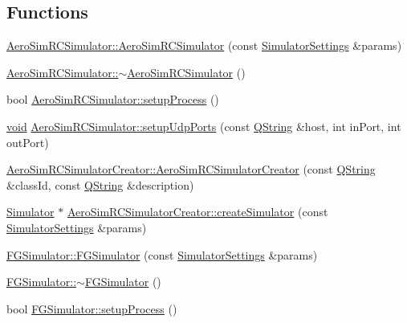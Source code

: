 \subsection*{\-Functions}
\begin{DoxyCompactItemize}
\item 
\hyperlink{group___h_i_t_l_plugin_ga0f5306deb22a08981f652dbb154f3e55}{\-Aero\-Sim\-R\-C\-Simulator\-::\-Aero\-Sim\-R\-C\-Simulator} (const \hyperlink{group___h_i_t_l_plugin_ga052199f1328d3002bce3e45345aa7f4e}{\-Simulator\-Settings} \&params)
\item 
\hyperlink{group___h_i_t_l_plugin_ga8627049b9a905adb162384c682255bd3}{\-Aero\-Sim\-R\-C\-Simulator\-::$\sim$\-Aero\-Sim\-R\-C\-Simulator} ()
\item 
bool \hyperlink{group___h_i_t_l_plugin_gae47d5533f13e5ad9a6095ba2bc61bade}{\-Aero\-Sim\-R\-C\-Simulator\-::setup\-Process} ()
\item 
\hyperlink{group___u_a_v_objects_plugin_ga444cf2ff3f0ecbe028adce838d373f5c}{void} \hyperlink{group___h_i_t_l_plugin_ga593e2c3f1a4b5e541f32668be73ece6d}{\-Aero\-Sim\-R\-C\-Simulator\-::setup\-Udp\-Ports} (const \hyperlink{group___u_a_v_objects_plugin_gab9d252f49c333c94a72f97ce3105a32d}{\-Q\-String} \&host, int in\-Port, int out\-Port)
\item 
\hyperlink{group___h_i_t_l_plugin_ga7e85a0e376c9dcd7dae84a4f2cf14d10}{\-Aero\-Sim\-R\-C\-Simulator\-Creator\-::\-Aero\-Sim\-R\-C\-Simulator\-Creator} (const \hyperlink{group___u_a_v_objects_plugin_gab9d252f49c333c94a72f97ce3105a32d}{\-Q\-String} \&class\-Id, const \hyperlink{group___u_a_v_objects_plugin_gab9d252f49c333c94a72f97ce3105a32d}{\-Q\-String} \&description)
\item 
\hyperlink{class_simulator}{\-Simulator} $\ast$ \hyperlink{group___h_i_t_l_plugin_ga25c808a48fec179504d84ef28fe8e762}{\-Aero\-Sim\-R\-C\-Simulator\-Creator\-::create\-Simulator} (const \hyperlink{group___h_i_t_l_plugin_ga052199f1328d3002bce3e45345aa7f4e}{\-Simulator\-Settings} \&params)
\item 
\hyperlink{group___h_i_t_l_plugin_gac56390412d899fc09748d050d06a7fab}{\-F\-G\-Simulator\-::\-F\-G\-Simulator} (const \hyperlink{group___h_i_t_l_plugin_ga052199f1328d3002bce3e45345aa7f4e}{\-Simulator\-Settings} \&params)
\item 
\hyperlink{group___h_i_t_l_plugin_ga379c8b16215b0b40514c3b522fabf816}{\-F\-G\-Simulator\-::$\sim$\-F\-G\-Simulator} ()
\item 
bool \hyperlink{group___h_i_t_l_plugin_ga704da6f44b2b3538b2e1c3239cb2a76c}{\-F\-G\-Simulator\-::setup\-Process} ()

\end{DoxyCompactItemize}
